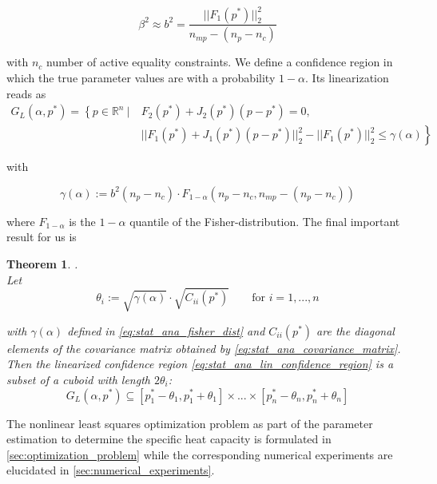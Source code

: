 \documentclass{scrartcl}[12pt, halfparskip]
\numberwithin{equation}{section}
\numberwithin{figure}{section}
\numberwithin{table}{section}
\newtheorem{Theorem}{Theorem}
\begin{document}
\begin{equation}
	\beta^2 \approx b^2 = \frac{|| F_1(p^*) ||_2^2}{n_{mp} - (n_p - n_c)}
\end{equation}

with $n_c$ number of active equality constraints. We define a confidence region in which the true parameter values are with a probability $1-\alpha$. Its linearization reads as
\begin{align}
	G_L(\alpha, p^*) = \left\{ p \in \mathbb{R}^n \ | \ \right. & F_2(p^*) + J_2(p^*)(p - p^*) = 0, \label{eq:stat_ana_lin_confidence_region} \\ 
	& \left. || F_1(p^*) + J_1(p^*)(p - p^*) ||_2^2 - || F_1(p^*)||_2^2 \le \gamma(\alpha) \right\} \nonumber	
\end{align}

with 

\begin{equation}
	\gamma(\alpha) := b^2 (n_p - n_c) \cdot F_{1-\alpha}(n_p - n_c, n_{mp} - (n_p - n_c))
	\label{eq:stat_ana_fisher_dist}
\end{equation}

where $F_{1-\alpha}$ is the $1-\alpha$ quantile of the Fisher-distribution. The final important result for us is

\begin{Theorem} .\\
	Let 
	\begin{equation}
		\theta_i := \sqrt{\gamma(\alpha)} \cdot \sqrt{C_{ii}(p^*)} \qquad \text{for } i=1,...,n
	\end{equation}
	
	with $\gamma(\alpha)$ defined in \cref{eq:stat_ana_fisher_dist} and $C_{ii}(p^*)$ are the diagonal elements of the covariance matrix obtained by \cref{eq:stat_ana_covariance_matrix}. Then the linearized confidence region \cref{eq:stat_ana_lin_confidence_region} is a subset of a cuboid with length $2 \theta_i$:
	\begin{equation}
		G_L(\alpha, p^*) \subseteq [p_1^* - \theta_1, p_1^* + \theta_1] \times ... \times [p_n^* - \theta_n, p_n^* + \theta_n]
	\end{equation}
	
\end{Theorem}


\vspace{0.5cm}
The nonlinear least squares optimization problem as part of the parameter estimation to determine the specific heat capacity is formulated in \cref{sec:optimization_problem} while the corresponding numerical experiments are elucidated in \cref{sec:numerical_experiments}.
\end{document}
